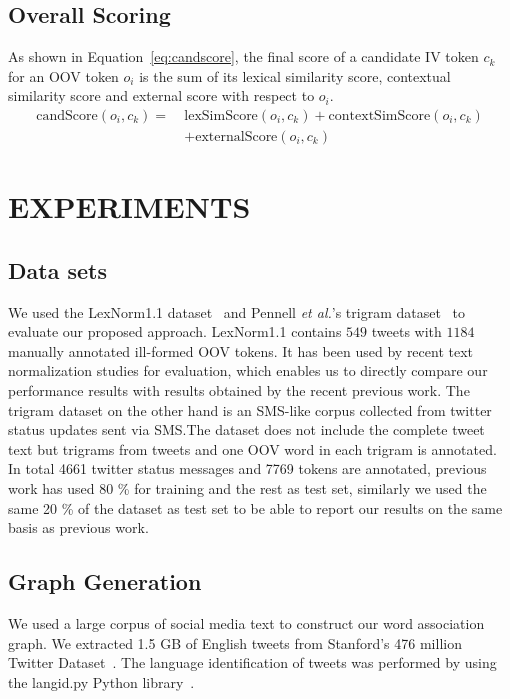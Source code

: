 \documentclass[a4paper,onesided,12pt]{report}
\begin{document}
\section{Overall Scoring}

As shown in Equation~\ref{eq:candscore}, the final score of a candidate IV token $c_k$ for an OOV token $o_i$ is the sum of its lexical similarity score, contextual similarity score and external score with respect to $o_i$.
\begin{equation}
\begin{aligned}
\text{candScore}(o_i,c_k) = ~ & \text{lexSimScore}(o_i,c_k) + \text{contextSimScore}(o_i,c_k) \\
& + \text{externalScore}(o_i,c_k)
\end{aligned}
\label{eq:candscore}
\end{equation}

\chapter{EXPERIMENTS}
\label{sec:experiments}

\section{Data sets}
\label{sec:datasets}
We used the LexNorm1.1 dataset~\cite{Han:2011:LNS:2002472.2002520} and Pennell \textit{et al.}'s trigram dataset~\cite{pennell2011character,Pennell2014256} to evaluate our proposed approach. LexNorm1.1 contains $549$ tweets with $1184$ manually annotated ill-formed OOV tokens. It has been used by recent text normalization studies for evaluation, which enables us to directly compare our performance results with results obtained by the recent previous work. The trigram dataset on the other hand is an SMS-like corpus collected from twitter status updates sent via SMS.\@ The dataset does not include the complete tweet text but trigrams from tweets and one OOV word in each trigram is annotated. In total 4661 twitter status messages and 7769 tokens are annotated, previous work has used 80 \% for training and the rest as test set, similarly we used the same 20 \% of the dataset as test set to be able to report our results on the same basis as previous work.

\section{Graph Generation}
We used a large corpus of social media text to construct our word association graph. We extracted 1.5 GB of English tweets from Stanford's 476 million Twitter Dataset~\cite{DBLP:conf/wsdm/YangL11}. The language identification of tweets was performed by using the langid.py Python library~\cite{Lui:2012:LOL:2390470.2390475, Baldwin:2010:LIL:1857999.1858026}.
\end{document}
